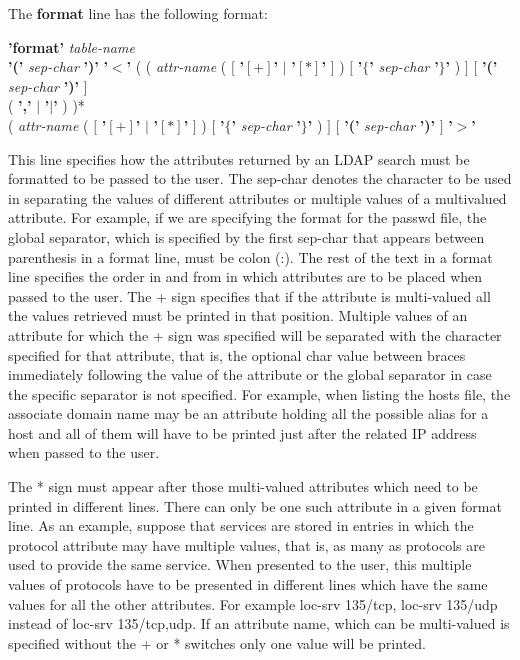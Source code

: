 The {\bf format} line has the following format:


\begin{center}
{\bf 'format'} {\em table-name}\\
{\bf '('} {\em sep-char} {\bf ')'}
{\bf '$<$'} ( ( {\em attr-name} ( $[$ {\bf '$[+]$'} $|$ {\bf '$[*]$'} $]$ )
$[$ {\bf '$\{$'} {\em sep-char} {\bf '$\}$'} ) $]$
$[$ {\bf '('} {\em sep-char} {\bf ')'} $]$\\
( {\bf ','} $|$ {\bf '$|$'} ) )*\\
( {\em attr-name} ( $[$ {\bf '$[+]$'} $|$ {\bf '$[*]$'} $]$ )
$[$ {\bf '$\{$'} {\em sep-char} {\bf '$\}$'} ) $]$
$[$ {\bf '('} {\em sep-char} {\bf ')'} $]$
{\bf '$>$'}
\end{center}

This line specifies how the attributes returned by an LDAP search must
be formatted to be passed to the user. The sep-char denotes the
character to be used in separating the values of different attributes
or multiple values of a multivalued attribute. For example, if we are
specifying the format for the passwd file, the global separator, which
is specified by the first sep-char that appears between parenthesis in
a format line, must be colon (:). The rest of the text in a format
line specifies the order in and from in which attributes are to be
placed when passed to the user. The + sign specifies that if the
attribute is multi-valued all the values retrieved must be printed in
that position. Multiple values of an attribute for which the + sign
was specified will be separated with the character specified for that
attribute, that is, the optional char value between braces immediately
following the value of the attribute or the global separator in case
the specific separator is not specified. For example, when listing the
hosts file, the associate domain name may be an attribute holding all
the possible alias for a host and all of them will have to be printed
just after the related IP address when passed to the user.

The * sign must appear after those multi-valued attributes which need
to be printed in different lines. There can only be one such attribute
in a given format line. As an example, suppose that services are stored
in entries in which the protocol attribute may have multiple values,
that is, as many as protocols are used to provide the same
service. When presented to the user, this multiple values of protocols
have to be presented in different lines which have the same values for
all the other attributes. For example loc-srv 135/tcp, loc-srv 135/udp
instead of loc-srv 135/tcp,udp.  If an attribute name, which can be
multi-valued is specified without the + or * switches only one value
will be printed.


